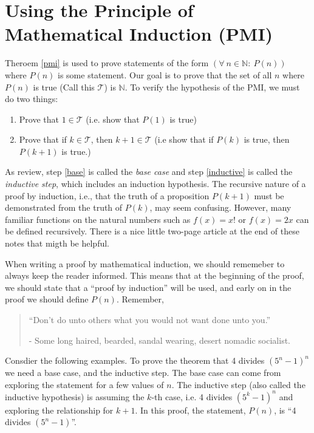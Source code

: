 \section{Using the Principle of Mathematical Induction (PMI)} Theroem \ref{pmi} is used to prove statements of the form $(\forall~ n \in \mathbb{N}: ~P(n))$ where $P(n)$ is some statement.  Our goal is to prove that the set of all $n$ where $P(n)$ is true  (Call this $\mathcal{T}$) is $\mathbb{N}$. To verify the hypothesis of the PMI, we must do two things:
\begin{enumerate}
\item Prove that $1\in \mathcal{T}$ (i.e. show that $P(1)$ is true)\label{base}
\item Prove that if $k\in \mathcal{T}$, then $k+1\in \mathcal{T}$ (i.e show that if $P(k)$ is true, then $P(k+1)$ is true.)\label{inductive}
\end{enumerate}

As review, step \ref{base} is called the \emph{base case} and step \ref{inductive} is called the  \emph{inductive step}, which includes an induction hypothesis.
The recursive nature of a proof by induction, i.e., that the truth of a proposition $P(k + 1)$ must be demonstrated from the truth of $P(k)$, may seem confusing. However, many familiar functions on the natural numbers such as $f(x) = x!$ or $f(x) = 2x$ can be defined recursively.  There is a nice little two-page article at the end of these notes that migth be helpful. %

When writing a proof by mathematical induction, we should rememeber to always keep the reader informed. This means that at the beginning of the proof, we should state that a ``proof by induction'' will be used, and early on in the proof we should define $P(n)$.  Remember, 
\begin{quotation}
``Don't do unto others what you would not want done unto you.''

\hfill - Some long haired, bearded, sandal wearing, desert nomadic socialist.
\end{quotation}

Consdier the following examples.  To prove the theorem that 4 divides $\left( 5^n-1\right)^n$ we need a base case, and the inductive step.  The base case can come from exploring the statement for a few values of $n$.  The inductive step (also called the inductive hypothesis) is assuming the $k$-th case, i.e. 4 divides $\left( 5^k-1\right)^n$ and exploring the relationship for $k+1$.  In this proof, the statement, $P(n)$, is ``4 divides $\left( 5^n-1\right)$''.  

